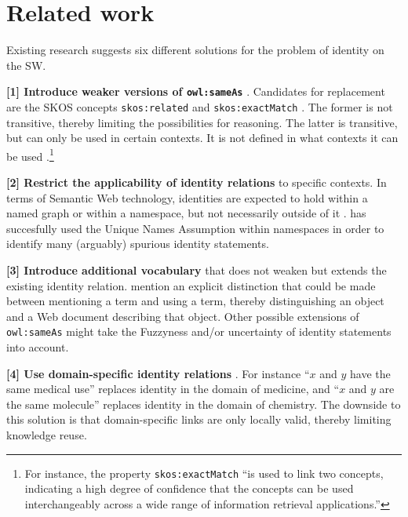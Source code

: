 \section{Related work}
\label{sec:related_work}

Existing research suggests six different solutions for
  the problem of identity on the SW.

\textbf{[1] Introduce weaker versions of {\small \texttt{owl:sameAs}}}
  \cite{HalpinHayes2010,MccuskerMcguinness2010}.
Candidates for replacement are
  the SKOS concepts
  {\small \texttt{skos:related}} and {\small \texttt{skos:exactMatch}}
  \cite{MilesBechhofer2009}.
The former is not transitive,
  thereby limiting the possibilities for reasoning.
The latter is transitive,
  but can only be used in certain contexts.
It is not defined in what contexts it can be used
  \cite{MilesBechhofer2009}.\footnote{
    For instance, the property {\small \texttt{skos:exactMatch}}
    ``is used to link two concepts, indicating a high degree of confidence
    that the concepts can be used interchangeably across a wide range of
    information retrieval applications.''
  }
\begin{comment}
The problem with using weaker notions such as relatedness,
  is that everything is related to everything in \emph{some} way.}
\end{comment}

\textbf{[2] Restrict the applicability of identity relations}
  to specific contexts.
In terms of Semantic Web technology, identities are expected to hold
  within a named graph or within a namespace,
  but not necessarily outside of it \cite{HalpinHayes2010}.
\cite{Melo2013} has succesfully used the Unique Names Assumption
  within namespaces in order to identify many (arguably) spurious
  identity statements.

\textbf{[3] Introduce additional vocabulary} that does not weaken but extends
  the existing identity relation.
\cite{HalpinHayes2010} mention an explicit distinction that could be made
  between mentioning a term and using a term,
  thereby distinguishing an object and a Web document describing that object.
Other possible extensions of {\small \texttt{owl:sameAs}} might take
  the Fuzzyness and/or uncertainty of identity statements into account.

\textbf{[4] Use domain-specific identity relations}
  \cite{MccuskerMcguinness2010}.
For instance
    ``$x$ and $y$ have the same medical use''
  replaces
    identity in the domain of medicine,
and
    ``$x$ and $y$ are the same molecule''
  replaces
    identity in the domain of chemistry.
The downside to this solution is that domain-specific links are
  only locally valid, thereby limiting knowledge reuse.

